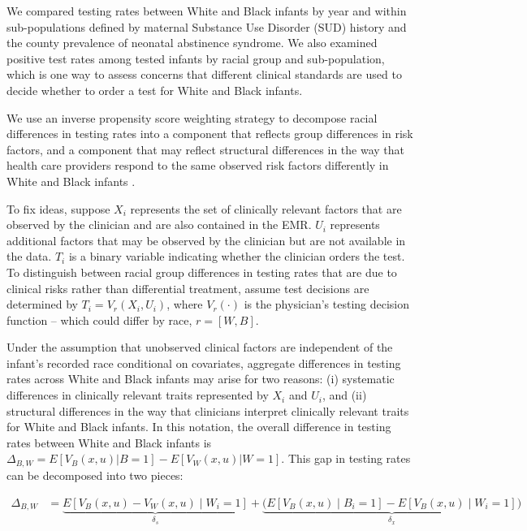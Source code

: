We compared testing rates between White and Black infants by year and within sub-populations defined by maternal Substance Use Disorder (SUD) history and the county prevalence of neonatal abstinence syndrome. We also examined positive test rates among tested infants by racial group and sub-population, which is one way to assess concerns that different clinical standards are used to decide whether to order a test for White and Black infants.  

We use an inverse propensity score weighting strategy to decompose racial differences in testing rates into a component that reflects group differences in risk factors, and a component that may reflect structural differences in the way that health care providers respond to the same observed risk factors differently in White and Black infants \citep{fortin2011decomposition}. 

To fix ideas, suppose $X_i$ represents the set of clinically relevant factors that are observed by the clinician and are also contained in the EMR. $U_i$ represents additional factors that may be observed by the clinician but are not available in the data. $T_i$ is a binary variable indicating whether the clinician orders the test. To distinguish between racial group differences in testing rates that are due to clinical risks rather than differential treatment, assume test decisions are determined by $T_i = V_{r}(X_i, U_i)$, where $V_{r}(\cdot)$ is the physician's testing decision function -- which could differ by race, $r =[W,B]$. 

Under the assumption that unobserved clinical factors are independent of the infant's recorded race conditional on covariates, aggregate differences in testing rates across White and Black infants may arise for two reasons: (i) systematic differences in clinically relevant traits represented by $X_i$ and $U_i$, and (ii) structural differences in the way that clinicians interpret clinically relevant traits for White and Black infants. In this notation, the overall difference in testing rates between White and Black infants is $\Delta_{B,W} = E[V_B(x,u)|B = 1] - E[V_W(x,u)|W = 1]$. This gap in testing rates can be decomposed into two pieces:

\begin{align*}
    \Delta_{B,W} &= \underbrace{E[V_B(x,u) - V_W(x,u) \mid W_i = 1]}_{\delta_s} + \underbrace{\big(E[V_B(x,u) \mid B_i = 1] - E[V_B(x,u) \mid W_i = 1]\big)}_{\delta_x}
\end{align*}

